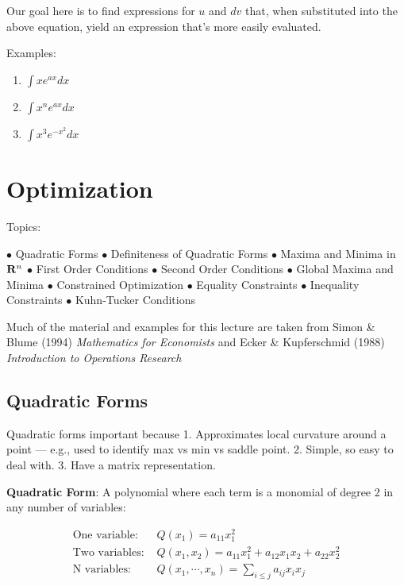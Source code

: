 \documentclass[]{book}
\theoremstyle{definition}
\theoremstyle{definition}
\theoremstyle{definition}
\theoremstyle{remark}
\begin{document}
Our goal here is to find expressions for \(u\) and \(dv\) that, when
substituted into the above equation, yield an expression that's more
easily evaluated.

Examples:

\begin{framed}
\begin{enumerate}
        \item $\int x e^{ax} dx$
        \item $\int x^n e^{ax} dx$\\
        \item $\int x^3 e^{-x^2} dx$\\
\vspace{10pt}
\end{enumerate}
\end{framed}

\chapter{Optimization}\label{optimization}

Topics:

\(\bullet\) Quadratic Forms \(\bullet\) Definiteness of Quadratic Forms
\(\bullet\) Maxima and Minima in \({\bf R}^n\) \(\bullet\) First Order
Conditions \(\bullet\) Second Order Conditions \(\bullet\) Global Maxima
and Minima \(\bullet\) Constrained Optimization \(\bullet\) Equality
Constraints \(\bullet\) Inequality Constraints \(\bullet\) Kuhn-Tucker
Conditions

Much of the material and examples for this lecture are taken from Simon
\& Blume (1994) \emph{Mathematics for
Economists} and Ecker \& Kupferschmid (1988) \emph{Introduction to
Operations Research}

\section{Quadratic Forms}\label{quadratic-forms}

Quadratic forms important because 1. Approximates local curvature around
a point --- e.g., used to identify max vs min vs saddle point. 2.
Simple, so easy to deal with. 3. Have a matrix representation.

\textbf{Quadratic Form}: A polynomial where each term is a monomial of
degree 2 in any number of variables:

\begin{align*}
\text{One variable: }& Q(x_1) = a_{11}x_1^2\\
\text{Two variables: }& Q(x_1,x_2) = a_{11}x_1^2 + a_{12}x_1x_2 + a_{22}x_2^2\\
\text{N variables: }& Q(x_1,\cdots,x_n)=\sum\limits_{i\le j} a_{ij}x_i x_j
\end{align*}
\end{document}
